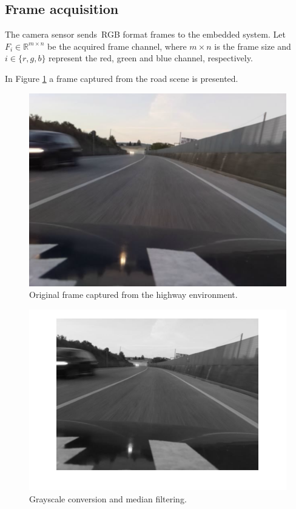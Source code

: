 \subsection{Frame acquisition}
\label{subsec:Frame_acquisition}


The camera sensor sends~\gls{RGB} format frames to the embedded system. Let $F_i \in \mathbb{R}^{m \times n}$ be the acquired frame channel, where $m\times n$ is the frame size and $i \in \{r,g,b\}$ represent the red, green and blue channel, respectively.

In Figure \ref{fig:road_original} a frame captured from the road scene is presented.

%
\begin{figure}[ht]
	\centering
	\includegraphics[scale=0.55]{figure/Part1/Chapter4/figures/way2.png}
	\caption{Original frame captured from the highway environment.}
	\label{fig:road_original}
\end{figure}

\begin{figure}[ht]
	\centering
	\includegraphics[scale=0.45]{figure/Part1/Chapter4/figures/way3.png}
	\caption{Grayscale conversion and median filtering.}
	\label{fig:road_original_grey}
\end{figure}



